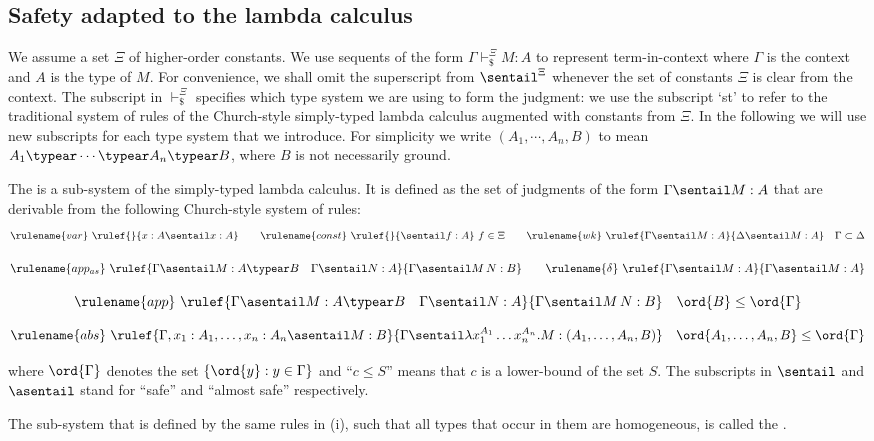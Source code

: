 \subsection*{Safety adapted to the lambda calculus}
We assume a set $\Xi$ of higher-order constants. We use sequents of
the form $\Gamma \vdash_\$^\Xi M : A$ to represent term-in-context
where $\Gamma$ is the context and $A$ is the type of $M$. For
convenience, we shall omit the superscript from $\sentail^\Xi$
whenever the set of constants $\Xi$ is clear from the context. The
subscript in $\vdash_\$^\Xi$ specifies which type system we are
using to form the judgment: we use the subscript `st' to refer to
the traditional system of rules of the Church-style simply-typed
lambda calculus augmented with constants from $\Xi$. In the
following we will use new subscripts for each type system that we
introduce. For simplicity we write $(A_1, \cdots, A_n, B)$ to mean
$A_1 \typear \cdots \typear A_n \typear B$, where $B$ is not
necessarily ground.

\begin{definition}\rm
\label{def:safelambda}
\begin{inparaenum}[(i)]
\item The  is a sub-system of the
  simply-typed lambda calculus. It is defined as the set of judgments of the form $\Gamma \sentail M : A$ that are derivable from the following Church-style system of rules:
$$ \rulename{var} \ \rulef{}{x : A\sentail x : A} \qquad
\rulename{const} \ \rulef{}{\sentail f : A}~f \in \Xi \qquad
\rulename{wk} \ \rulef{\Gamma \sentail M : A}{\Delta \sentail M : A} \quad
\Gamma \subset \Delta$$

$$ \rulename{app_{as}} \ \rulef{\Gamma \asentail M : A\typear B
\quad \Gamma \sentail N : A} {\Gamma \asentail M\, N : B}
\qquad
\rulename{\delta} \ \rulef{\Gamma \sentail M : A}{\Gamma \asentail M : A}
$$

$$ \rulename{app} \ \rulef{\Gamma \asentail M : A\typear B
\quad \Gamma \sentail N : A} {\Gamma \sentail M\, N : B} \quad \ord{B} \leq
\ord{\Gamma}$$

$$ \rulename{abs} \ \rulef{\Gamma, x_1 : A_1, \ldots, x_n : A_n
  \asentail M : B} {\Gamma \sentail \lambda x_1^{A_1} \ldots x_n^{A_n} . M :
  (A_1, \ldots ,A_n,B)} \quad \ord{A_1, \ldots ,A_n,B} \leq
\ord{\Gamma}$$
\smallskip

\noindent where $\ord{\Gamma}$ denotes the set $\{ \ord{y} : y \in
\Gamma \}$ and ``$c \leq S$'' means that $c$ is a lower-bound of the
set $S$. The subscripts in $\sentail$ and $\asentail$ stand for
``safe'' and ``almost safe'' respectively.

\noindent \item The sub-system that is defined by the same rules in
(i), such that all types that occur in them are homogeneous, is called
the .
\end{inparaenum}
\end{definition}


